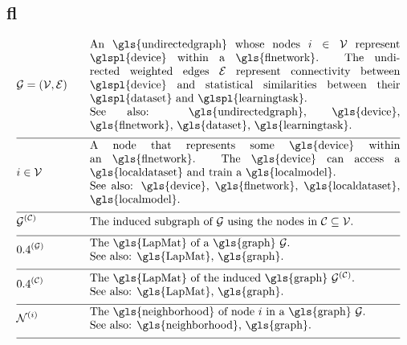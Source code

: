 \newpage
\subsection*{\Gls{fl}}

\begin{align}
 	&\graph = \pair{\nodes}{\edges} & \quad & \parbox{.80\textwidth}{An \gls{undirectedgraph} whose nodes $\nodeidx \in \nodes$ represent 
		\glspl{device} within a \gls{flnetwork}. The undirected weighted edges $\edges$ represent connectivity between 
		\glspl{device} and statistical similarities between their \glspl{dataset} and \glspl{learningtask}.
		\\ See also: \gls{undirectedgraph}, \gls{device}, \gls{flnetwork}, \gls{dataset}, \gls{learningtask}. }\nonumber \\[2mm] \hline \nonumber\\[-5mm]
	&\nodeidx \in \nodes& \quad & \parbox{.80\textwidth}{A node that represents some 
		\gls{device} within an \gls{flnetwork}. The \gls{device} can access a \gls{localdataset} and train a \gls{localmodel}.
		\\ See also: \gls{device}, \gls{flnetwork}, \gls{localdataset}, \gls{localmodel}. }\nonumber \\[2mm] \hline \nonumber\\[-5mm]
	&\indsubgraph{\graph}{\cluster}& \quad & \parbox{.80\textwidth}{The induced subgraph of $\graph$ using the nodes in $\cluster \subseteq \nodes$. } \nonumber \\[2mm] \hline \nonumber\\[-5mm]
	&\LapMat{\graph}   & \quad & \parbox{.80\textwidth}{The \gls{LapMat} of a \gls{graph} $\graph$.
		\\ See also: \gls{LapMat}, \gls{graph}. }\nonumber \\[2mm] \hline \nonumber\\[-5mm]
	&\LapMat{\cluster}   & \quad & \parbox{.80\textwidth}{The \gls{LapMat} of the induced \gls{graph} $\indsubgraph{\graph}{\cluster}$.
		\\ See also: \gls{LapMat}, \gls{graph}. } \nonumber \\[2mm] \hline \nonumber\\[-5mm]
	 &\neighbourhood{\nodeidx}  & \quad & \parbox{.80\textwidth}{The \gls{neighborhood} of node $\nodeidx$ in a \gls{graph} $\graph$.
	 	\\ See also: \gls{neighborhood}, \gls{graph}. }   \nonumber \\[2mm] \hline \nonumber\\[-5mm]

\end{align}
